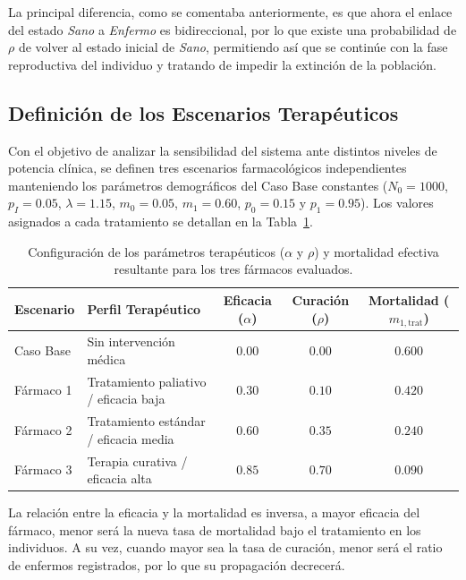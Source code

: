 \documentclass[graybox]{SNmult}
\begin{document}
	
	La principal diferencia, como se comentaba anteriormente, es que ahora el enlace del estado \textit{Sano} a \textit{Enfermo} es bidireccional, por lo que existe una probabilidad de $\rho$ de volver al estado inicial de \textit{Sano}, permitiendo así que se continúe con la fase reproductiva del individuo y tratando de impedir la extinción de la población. 
	
	
	\subsection{Definición de los Escenarios Terapéuticos}
	Con el objetivo de analizar la sensibilidad del sistema ante distintos niveles de potencia clínica, se definen tres escenarios farmacológicos independientes manteniendo los parámetros demográficos del Caso Base constantes ($N_0 = 1000$, $p_I = 0.05$, $\lambda = 1.15$, $m_0 = 0.05$, $m_1 = 0.60$, $p_0 = 0.15$ y $p_1 = 0.95$). Los valores asignados a cada tratamiento se detallan en la Tabla~\ref{tab:escenarios_farmacos}.
	
	\begin{table}[htbp]
		\caption{Configuración de los parámetros terapéuticos ($\alpha$ y $\rho$) y mortalidad efectiva resultante para los tres fármacos evaluados.}
		\label{tab:escenarios_farmacos}
		\centering
		\begin{tabular}{llccc}
			\hline
			\textbf{Escenario} & \textbf{Perfil Terapéutico} & \textbf{Eficacia ($\alpha$)} & \textbf{Curación ($\rho$)} & \textbf{Mortalidad ($m_{1,\text{trat}}$)} \\
			\hline
			Caso Base & Sin intervención médica & $0.00$ & $0.00$ & $0.600$ \\
			Fármaco 1 & Tratamiento paliativo / eficacia baja & $0.30$ & $0.10$ & $0.420$ \\
			Fármaco 2 & Tratamiento estándar / eficacia media & $0.60$ & $0.35$ & $0.240$ \\
			Fármaco 3 & Terapia curativa / eficacia alta & $0.85$ & $0.70$ & $0.090$ \\
			\hline
		\end{tabular}
	\end{table}
	
	La relación entre la eficacia y la mortalidad es inversa, a mayor eficacia del fármaco, menor será la nueva tasa de mortalidad bajo el tratamiento en los individuos. A su vez, cuando mayor sea la tasa de curación, menor será el ratio de enfermos registrados, por lo que su propagación decrecerá. 
	
\end{document}
